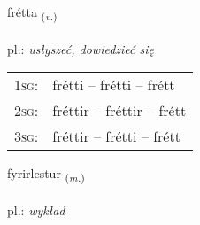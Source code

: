 \documentclass[frontgrid, backgrid]{flacards}\usepackage[]{graphicx}\usepackage[]{xcolor}
\begin{document}
\renewcommand{\blhead}{\vskip5pt {\small\bfseries\footnotesize Sagnorð | Verb }}
\renewcommand{\bcfoot}{\vskip5pt \hspace{2pt}{\small\bfseries\footnotesize 2K}}


{frétta \small{\textsubscript{(\textit{v.})}} \\[1ex] %
\textphonetic{[frjɛhta]} \\
pl.: \emph{usłyszeć, dowiedzieć się} \\  [2ex]
\renewcommand*{\arraystretch}{0.8}
\begin{tabular}{p{1cm}l}
\textsc{1sg}: & frétti -- frétti -- frétt \\ 
\textsc{2sg}: & fréttir -- fréttir -- frétt \\ 
\textsc{3sg}: & fréttir -- frétti -- frétt \\ 
\end{tabular}
}

\renewcommand{\flhead}{\vskip5pt \fboxsep=0pt {\small\bfseries\footnotesize Nafnorð | Noun}}
\renewcommand{\fcfoot}{\vskip5pt \fboxsep=0pt \hspace{2pt}{\small\bfseries\footnotesize 2K}}

\renewcommand{\blhead}{\vskip5pt {\small\bfseries\footnotesize Nafnorð | Noun }}
\renewcommand{\bcfoot}{\vskip5pt \hspace{2pt}{\small\bfseries\footnotesize 2K}}


{fyrirlestur \small{\textsubscript{(\textit{m.})}} \\[1ex] %
\textphonetic{[fɪːrɪrlɛstʏr]} \\
pl.: \emph{wykład} \\  [2ex]
\renewcommand*{\arraystretch}{0.8}
}
\end{document}
